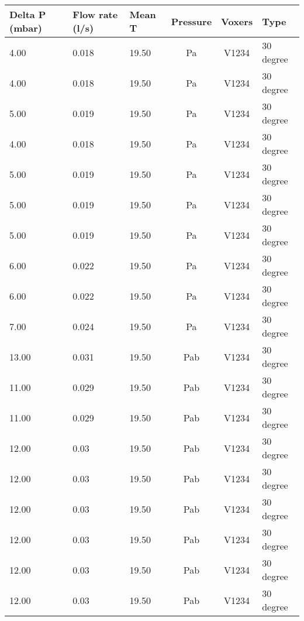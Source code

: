 \begin{table}[t]
\centering
\begin{tabular}{l | l | l | c | c | l}
Delta P (mbar) & Flow rate (l/s) & Mean T & Pressure & Voxers & Type                \\ \hline
4.00           & 0.018           & 19.50  & Pa       & V1234  & 30 degree           \\
4.00           & 0.018           & 19.50  & Pa       & V1234  & 30 degree           \\
5.00           & 0.019           & 19.50  & Pa       & V1234  & 30 degree           \\
4.00           & 0.018           & 19.50  & Pa       & V1234  & 30 degree           \\
5.00           & 0.019           & 19.50  & Pa       & V1234  & 30 degree           \\
5.00           & 0.019           & 19.50  & Pa       & V1234  & 30 degree           \\
5.00           & 0.019           & 19.50  & Pa       & V1234  & 30 degree           \\
6.00           & 0.022           & 19.50  & Pa       & V1234  & 30 degree           \\
6.00           & 0.022           & 19.50  & Pa       & V1234  & 30 degree           \\
7.00           & 0.024           & 19.50  & Pa       & V1234  & 30 degree           \\
13.00          & 0.031           & 19.50  & Pab      & V1234  & 30 degree           \\
11.00          & 0.029           & 19.50  & Pab      & V1234  & 30 degree           \\
11.00          & 0.029           & 19.50  & Pab      & V1234  & 30 degree           \\
12.00          & 0.03            & 19.50  & Pab      & V1234  & 30 degree           \\
12.00          & 0.03            & 19.50  & Pab      & V1234  & 30 degree           \\
12.00          & 0.03            & 19.50  & Pab      & V1234  & 30 degree           \\
12.00          & 0.03            & 19.50  & Pab      & V1234  & 30 degree           \\
12.00          & 0.03            & 19.50  & Pab      & V1234  & 30 degree           \\
12.00          & 0.03            & 19.50  & Pab      & V1234  & 30 degree           \\

\end{tabular}
\end{table}
